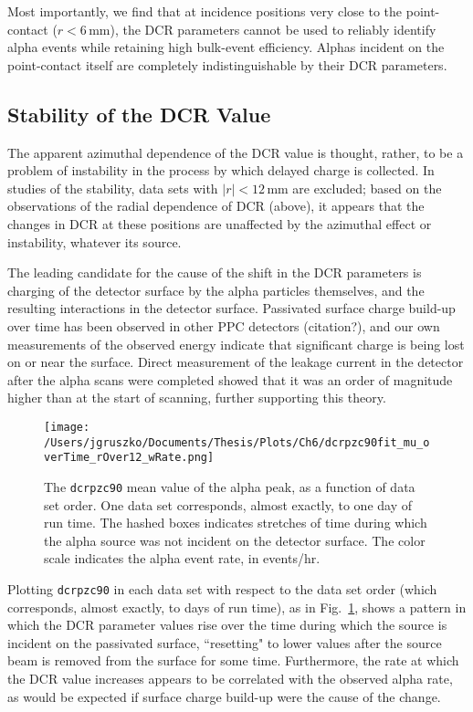 Most importantly, we find that at incidence positions very close to the point-contact ($r<6$\,mm), the DCR parameters cannot be used to reliably identify alpha events while retaining high bulk-event efficiency. Alphas incident on the point-contact itself are completely indistinguishable by their DCR parameters.   

\subsection{Stability of the DCR Value}
The apparent azimuthal dependence of the DCR value is thought, rather, to be a problem of instability in the process by which delayed charge is collected. In studies of the stability, data sets with $|r|<12$\,mm are excluded; based on the observations of the radial dependence of DCR (above), it appears that the changes in DCR at these positions are unaffected by the azimuthal effect or instability, whatever its source. 

The leading candidate for the cause of the shift in the DCR parameters is charging of the detector surface by the alpha particles themselves, and the resulting interactions in the detector surface. Passivated surface charge build-up over time has been observed in other PPC detectors (citation?), and our own measurements of the observed energy indicate that significant charge is being lost on or near the surface. Direct measurement of the leakage current in the detector after the alpha scans were completed showed that it was an order of magnitude higher than at the start of scanning, further supporting this theory. 

\begin{figure}[]
 \centering
 \texttt{[image: /Users/jgruszko/Documents/Thesis/Plots/Ch6/dcrpzc90fit\_mu\_overTime\_rOver12\_wRate.png]}
 \caption[DCR scan results as a function of data set order]{The {\tt dcrpzc90} mean value of the alpha peak, as a function of data set order. One data set corresponds, almost exactly, to one day of run time. The hashed boxes indicates stretches of time during which the alpha source was not incident on the detector surface. The color scale indicates the alpha event rate, in events/hr.} 
 \label{fig:DCRvT}
\end{figure}

Plotting {\tt dcrpzc90} in each data set with respect to the data set order (which corresponds, almost exactly, to days of run time), as in Fig.~\ref{fig:DCRvT}, shows a pattern in which the DCR parameter values rise over the time during which the source is incident on the passivated surface, ``resetting" to lower values after the source beam is removed from the surface for some time. Furthermore, the rate at which the DCR value increases appears to be correlated with the observed alpha rate, as would be expected if surface charge build-up were the cause of the change. 

